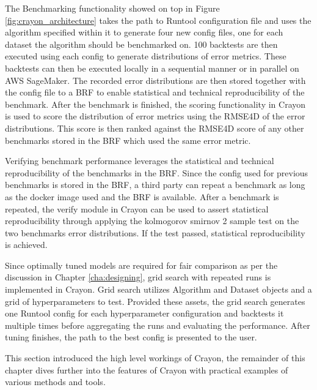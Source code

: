 The Benchmarking functionality showed on top in Figure \ref{fig:crayon_architecture} takes the path to Runtool configuration file and uses the algorithm specified within it to generate four new config files, one for each dataset the algorithm should be benchmarked on. 100 backtests are then executed using each config to generate distributions of error metrics. These backtests can then be executed locally in a sequential manner or in parallel on AWS SageMaker. The recorded error distributions are then stored together with the config file to a BRF to enable statistical and technical reproducibility of the benchmark. After the benchmark is finished, the scoring functionality in Crayon is used to score the distribution of error metrics using the RMSE4D of the error distributions. This score is then ranked against the RMSE4D score of any other benchmarks stored in the BRF which used the same error metric.

Verifying benchmark performance leverages the statistical and technical reproducibility of the benchmarks in the BRF. Since the config used for previous benchmarks is stored in the BRF, a third party can repeat a benchmark as long as the docker image used and the BRF is available. After a benchmark is repeated, the verify module in Crayon can be used to assert statistical reproducibility through applying the kolmogorov smirnov 2 sample test on the two benchmarks error distributions. If the test passed, statistical reproducibility is achieved.

Since optimally tuned models are required for fair comparison as per the discussion in Chapter \ref{cha:designing}, grid search with repeated runs is implemented in Crayon. Grid search utilizes Algorithm and Dataset objects and a grid of hyperparameters to test. Provided these assets, the grid search generates one Runtool config for each hyperparameter configuration and backtests it multiple times before aggregating the runs and evaluating the performance. After tuning finishes, the path to the best config is presented to the user.

This section introduced the high level workings of Crayon, the remainder of this chapter dives further into the features of Crayon with practical examples of various methods and tools.

